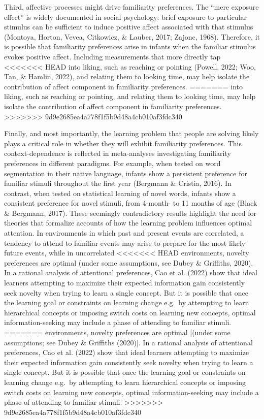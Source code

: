 \documentclass[10pt, letterpaper]{article}
\begin{document}
Third, affective processes might drive familiarity preferences. The
``mere exposure effect'' is widely documented in social psychology:
brief exposure to particular stimulus can be sufficient to induce
positive affect associated with that stimulus (Montoya, Horton, Vevea,
Citkowicz, \& Lauber, 2017; Zajonc, 1968). Therefore, it is possible
that familiarity preferences arise in infants when the familiar stimulus
evokes positive affect. Including measurements that more directly tap
<<<<<<< HEAD
into liking, such as reaching or pointing (Powell, 2022; Woo, Tan, \&
Hamlin, 2022), and relating them to looking time, may help isolate the
contribution of affect component in familiarity preferences.
=======
into liking, such as reaching or pointing, and relating them to looking
time, may help isolate the contribution of affect component in
familiarity preferences.
>>>>>>> 9d9e2685ea4a778f1f5b9d48a4cb010af3fdc340

Finally, and most importantly, the learning problem that people are
solving likely plays a critical role in whether they will exhibit
familiarity preferences. This context-dependence is reflected in
meta-analyses investigating familiarity preferences in different
paradigms. For example, when tested on word segmentation in their native
language, infants show a persistent preference for familiar stimuli
throughout the first year (Bergmann \& Cristia, 2016). In contrast, when
tested on statistical learning of novel words, infants show a consistent
preference for novel stimuli, from 4-month- to 11 months of age (Black
\& Bergmann, 2017). These seemingly contradictory results highlight the
need for theories that formalize accounts of how the learning problem
influences optimal attention. In environments in which past and present
events are correlated, a tendency to attend to familiar events may arise
to prepare for the most likely future events, while in uncorrelated
<<<<<<< HEAD
environments, novelty preferences are optimal (under some assumptions,
see Dubey \& Griffiths, 2020). In a rational analysis of attentional
preferences, Cao et al. (2022) show that ideal learners attempting to
maximize their expected information gain consistently seek novelty when
trying to learn a single concept. But it is possible that once the
learning goal or constraints on learning change e.g.~by attempting to
learn hierarchical concepts or imposing switch costs on learning new
concepts, optimal information-seeking may include a phase of attending
to familiar stimuli.
=======
environments, novelty preferences are optimal {[}(under some
assumptions; see Dubey \& Griffiths (2020){]}. In a rational analysis of
attentional preferences, Cao et al. (2022) show that ideal learners
attempting to maximize their expected information gain consistently seek
novelty when trying to learn a single concept. But it is possible that
once the learning goal or constraints on learning change e.g.~by
attempting to learn hierarchical concepts or imposing switch costs on
learning new concepts, optimal information-seeking may include a phase
of attending to familiar stimuli.
>>>>>>> 9d9e2685ea4a778f1f5b9d48a4cb010af3fdc340
\end{document}
